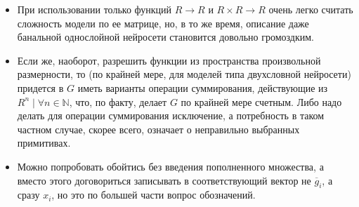 \documentclass[12pt,a4paper]{amsart}
\begin{document}
\begin{itemize}
  \item При использовании только функций $R \to R$ и $R \times R \to R$ очень легко считать сложность модели по ее
	матрице, но, в то же время, описание даже банальной однослойной нейросети становится довольно громоздким.
  \item Если же, наоборот, разрешить функции из пространства произвольной размерности, то (по крайней мере, для моделей
	типа двухсловной нейросети) придется в $G$ иметь варианты операции суммирования, действующие из
	$R^n \mid \forall n \in \mathbb{N}$, что, по факту, делает $G$ по крайней мере счетным. Либо надо делать для
	операции суммирования исключение, а потребность в таком частном случае, скорее всего, означает о неправильно
	выбранных примитивах.
  \item Можно попробовать обойтись без введения пополненного множества, а вместо этого договориться записывать в
	соответствующий вектор не $\overline{g}_i$, а сразу $x_i$, но это по большей части вопрос обозначений.
\end{itemize}


\extrasrussian

\end{document}
